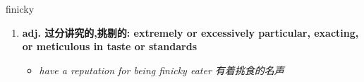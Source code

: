 
\begin{frame}
{\huge finicky}
\begin{center}
\begin{enumerate}\Large
  \item \textbf{adj. 过分讲究的,挑剔的: extremely or excessively particular, exacting, or meticulous in taste or standards}
  \begin{itemize}
    \item \em{\Large{have a reputation for being finicky eater 有着挑食的名声}}
  \end{itemize}
\end{enumerate}
\end{center}
\end{frame}
